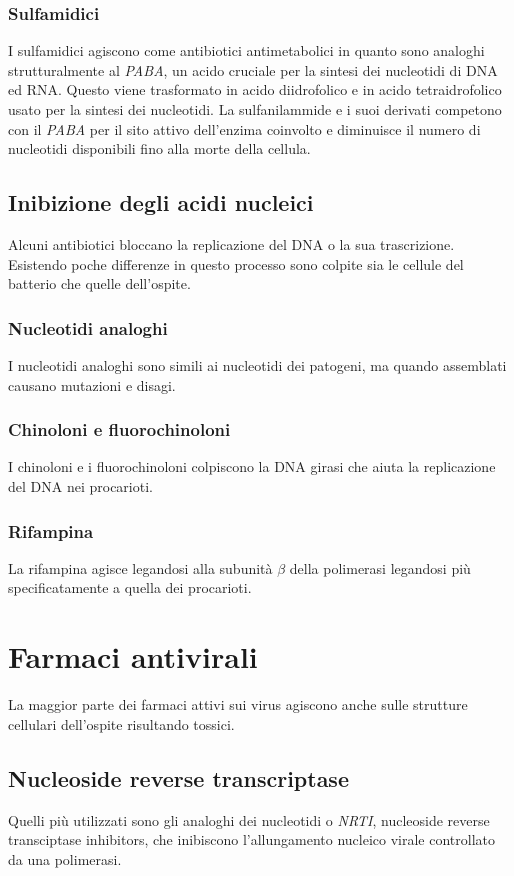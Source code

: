 		\subsubsection{Sulfamidici}
		I sulfamidici agiscono come antibiotici antimetabolici in quanto sono analoghi strutturalmente al \emph{PABA}, un acido cruciale per la sintesi dei nucleotidi di DNA ed RNA.
		Questo viene trasformato in acido diidrofolico e in acido tetraidrofolico usato per la sintesi dei nucleotidi.
		La sulfanilammide e i suoi derivati competono con il \emph{PABA} per il sito attivo dell'enzima coinvolto e diminuisce il numero di nucleotidi disponibili fino alla morte della cellula.

	\subsection{Inibizione degli acidi nucleici}
	Alcuni antibiotici bloccano la replicazione del DNA o la sua trascrizione.
	Esistendo poche differenze in questo processo sono colpite sia le cellule del batterio che quelle dell'ospite.

		\subsubsection{Nucleotidi analoghi}
		I nucleotidi analoghi sono simili ai nucleotidi dei patogeni, ma quando assemblati causano mutazioni e disagi.
		
		\subsubsection{Chinoloni e fluorochinoloni}
		I chinoloni e i fluorochinoloni colpiscono la DNA girasi che aiuta la replicazione del DNA nei procarioti.

		\subsubsection{Rifampina}
		La rifampina agisce legandosi alla subunit\`a $\beta$ della polimerasi legandosi pi\`u specificatamente a quella dei procarioti.

\section{Farmaci antivirali}
La maggior parte dei farmaci attivi sui virus agiscono anche sulle strutture cellulari dell'ospite risultando tossici.

	\subsection{Nucleoside reverse transcriptase}
	Quelli pi\`u utilizzati sono gli analoghi dei nucleotidi o \emph{NRTI}, nucleoside reverse transciptase inhibitors, che inibiscono l'allungamento nucleico virale controllato da una polimerasi.

